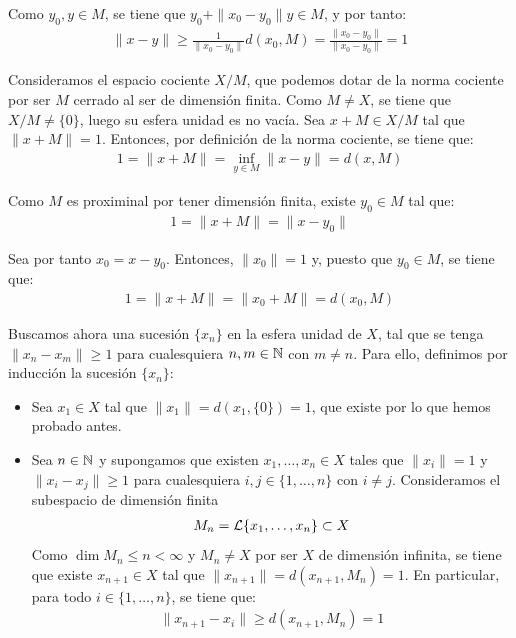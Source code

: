 \begin{ejercicio}
\begin{description}
\begin{description}
        Como $y_0,y \in M$, se tiene que $y_0 + \|x_0 - y_0\|y \in M$, y por tanto:
        \begin{align*}
            \|x - y\| \geq \frac{1}{\|x_0 - y_0\|} d(x_0, M) = \frac{\|x_0 - y_0\|}{\|x_0 - y_0\|} = 1
        \end{align*}
    \end{description}


    \item[Vía el cociente:] Consideramos el espacio cociente $X/M$, que podemos dotar de la norma cociente por ser $M$ cerrado al ser de dimensión finita. Como $M \neq X$, se tiene que $X/M \neq \{0\}$, luego su esfera unidad es no vacía. Sea $x + M \in X/M$ tal que $\|x + M\| = 1$. Entonces, por definición de la norma cociente, se tiene que:
    \begin{align*}
        1 = \|x + M\| = \inf\limits_{y \in M} \|x - y\| = d(x, M)
    \end{align*}

    Como $M$ es proximinal por tener dimensión finita, existe $y_0 \in M$ tal que:
    \begin{align*}
        1 = \|x + M\| = \|x - y_0\|
    \end{align*}

    Sea por tanto $x_0 = x - y_0$. Entonces, $\|x_0\| = 1$ y, puesto que $y_0 \in M$, se tiene que:
    \begin{align*}
        1 = \|x+M\| = \|x_0 + M\| = d(x_0, M)
    \end{align*}

\end{description}

Buscamos ahora una sucesión $\{x_n\}$ en la esfera unidad de $X$, tal que se tenga $\|x_n - x_m\| \geq 1$ para cualesquiera $n, m \in \mathbb{N}$ con $m \neq n$. Para ello, definimos por inducción la sucesión $\{x_n\}$:
\begin{itemize}
    \item Sea $x_1 \in X$ tal que $\|x_1\| = d(x_1, \{0\}) = 1$, que existe por lo que hemos probado antes.
    \item Sea $n \in \mathbb{N}$ y supongamos que existen $x_1, \ldots, x_n \in X$ tales que $\|x_i\| = 1$ y $\|x_i - x_j\| \geq 1$ para cualesquiera $i, j \in \{1, \ldots, n\}$ con $i \neq j$. Consideramos el subespacio de dimensión finita
    \begin{align*}
        M_n = \mathcal{L}\{x_1, \ldots, x_n\} \subset X
    \end{align*}
    Como $\dim M_n \leq n < \infty$ y $M_n \neq X$ por ser $X$ de dimensión infinita, se tiene que existe $x_{n+1} \in X$ tal que $\|x_{n+1}\| = d(x_{n+1}, M_n) = 1$. En particular, para todo $i \in \{1, \ldots, n\}$, se tiene que:
    \begin{align*}
        \|x_{n+1} - x_i\| \geq d(x_{n+1}, M_n) = 1
    \end{align*}
\end{itemize}


\end{ejercicio}
